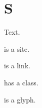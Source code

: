 \documentclass{amsart}
\begin{document}
\section{S}\label{s}
Text.

 is a site.

 is a link.

 has a class.

\octagon{} is a glyph.
\end{document}
